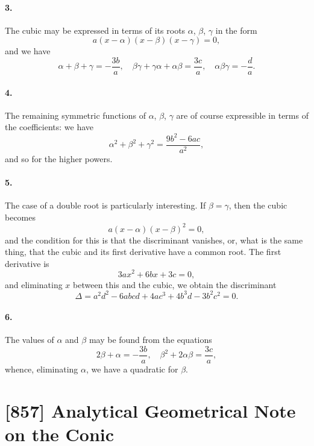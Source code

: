 \documentclass[11pt,a4paper]{article}
\theoremstyle{definition}
\begin{document}
\paragraph{3.} The cubic may be expressed in terms of its roots $\alpha$, $\beta$, $\gamma$ in the form
\[
a(x - \alpha)(x - \beta)(x - \gamma) = 0,
\]
and we have
\[
\alpha + \beta + \gamma = -\frac{3b}{a}, \quad \beta\gamma + \gamma\alpha + \alpha\beta = \frac{3c}{a}, \quad \alpha\beta\gamma = -\frac{d}{a}.
\]

\paragraph{4.} The remaining symmetric functions of $\alpha$, $\beta$, $\gamma$ are of course expressible in terms of the coefficients: we have
\[
\alpha^{2} + \beta^{2} + \gamma^{2} = \frac{9b^{2} - 6ac}{a^{2}},
\]
and so for the higher powers.

\paragraph{5.} The case of a double root is particularly interesting. If $\beta = \gamma$, then the cubic becomes
\[
a(x - \alpha)(x - \beta)^{2} = 0,
\]
and the condition for this is that the discriminant vanishes, or, what is the same thing, that the cubic and its first derivative have a common root. The first derivative is
\[
3ax^{2} + 6bx + 3c = 0,
\]
and eliminating $x$ between this and the cubic, we obtain the discriminant
\[
\Delta = a^{2}d^{2} - 6abcd + 4ac^{3} + 4b^{3}d - 3b^{2}c^{2} = 0.
\]

\paragraph{6.} The values of $\alpha$ and $\beta$ may be found from the equations
\[
2\beta + \alpha = -\frac{3b}{a}, \quad \beta^{2} + 2\alpha\beta = \frac{3c}{a},
\]
whence, eliminating $\alpha$, we have a quadratic for $\beta$.

\newpage
\section*{[857] Analytical Geometrical Note on the Conic}
\end{document}
